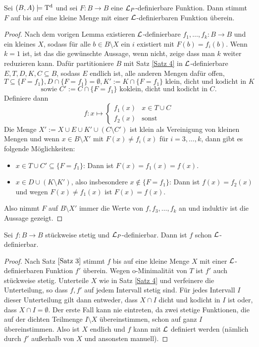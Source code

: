 \begin{theorem}\label{Satz 3}
	Sei $(B,A)\models\operatorname{T^d}$ und sei $F:B\rightarrow B$ eine $\mathcal{L}_P$-definierbare Funktion. Dann stimmt $F$ auf bis auf eine kleine Menge mit einer $\mathcal{L}$-definierbaren Funktion überein.
\end{theorem}
\begin{proof}
	Nach dem vorigen Lemma existieren $\mathcal{L}$-definierbare $f_1,\dots,f_k:B\rightarrow B$ und ein kleines $X$, sodass für alle $b\in B\setminus X$ ein $i$ existiert mit $F(b)=f_i(b)$. Wenn $k=1$ ist, ist das die gewünschte Aussage, wenn nicht, zeige dass man $k$ weiter reduzieren kann. Dafür partitioniere $B$ mit Satz \ref{Satz 4} in $\mathcal{L}$-definierbare $E,T,D,K,C\subseteq B$, sodass $E$ endlich ist, alle anderen Mengen dafür offen, 
	$$T\subseteq\{F=f_1\}, D\cap\{F=f_1\}=\emptyset,K':=K\cap\{F=f_1\}\text{ klein, dicht und kodicht in }K$$ $$\text{sowie }C':=C\cap\{F=f_1\}\text{ koklein, dicht und kodicht in }C.$$
	Definiere dann $$f:x\mapsto\left\{\begin{array}{ll}
	f_1(x)&x\in T\cup C\\
	f_2(x)&\text{sonst}
	\end{array}\right.$$
	Die Menge $X':=X\cup E\cup K'\cup (C\setminus C')$ ist klein als Vereinigung von kleinen Mengen und wenn $x\in B\setminus X'$ mit $F(x)\neq f_i(x)$ für $i=3,\dots,k$, dann gibt es folgende Möglichkeiten:
	\begin{itemize}
		\item $x\in T\cup C'\subseteq\{F=f_1\}$: Dann ist $F(x)=f_1(x)=f(x)$.
		\item $x\in D\cup(K\setminus K')$, also insbesondere $x\notin\{F=f_1\}$: Dann ist $f(x)=f_2(x)$ und wegen $F(x)\neq f_1(x)$ ist $F(x)=f(x)$.
	\end{itemize}
    Also nimmt $F$ auf $B\setminus X'$ immer die Werte von $f,f_3,\dots,f_k$ an und induktiv ist die Aussage gezeigt.
\end{proof}

\begin{lemma}\label{Stückweise stetige Abbildungen}
	Sei $f:B\rightarrow B$ stückweise stetig und $\mathcal{L}_P$-definierbar. Dann ist $f$ schon $\mathcal{L}$-definierbar.
\end{lemma}
\begin{proof}
	Nach Satz $\ref{Satz 3}$ stimmt $f$ bis auf eine kleine Menge $X$ mit einer $\mathcal{L}$-definierbaren Funktion $f'$ überein. Wegen o-Minimalität von $T$ ist $f'$ auch stückweise stetig. Unterteile $X$ wie in Satz \ref{Satz 4} und verfeinere die Unterteilung, so dass $f,f'$ auf jedem Intervall stetig sind. Für jedes Intervall $I$ dieser Unterteilung gilt dann entweder, dass $X\cap I$ dicht und kodicht in $I$ ist oder, dass $X\cap I=\emptyset$. Der erste Fall kann nie eintreten, da zwei stetige Funktionen, die auf der dichten Teilmenge $I\setminus X$ übereinstimmen, schon auf ganz $I$ übereinstimmen. Also ist $X$ endlich und $f$ kann mit $\mathcal{L}$ definiert werden (nämlich durch $f'$ außerhalb von $X$ und ansonsten manuell).
\end{proof}

